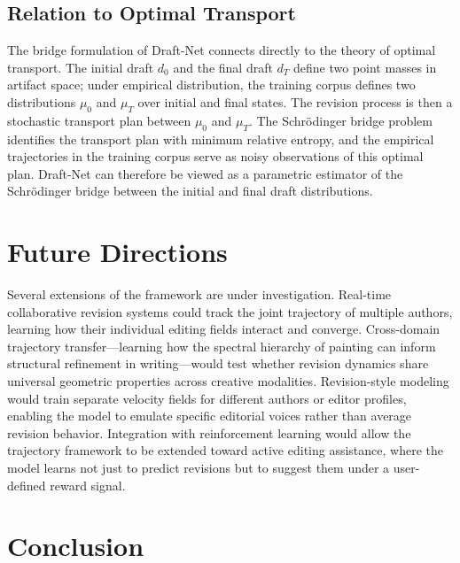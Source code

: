 \documentclass[12pt,a4paper]{article}
\theoremstyle{draftthm}
\begin{document}
\subsection{Relation to Optimal Transport}

The bridge formulation of Draft-Net connects directly to the theory of optimal transport. The initial draft $d_0$ and the final draft $d_T$ define two point masses in artifact space; under empirical distribution, the training corpus defines two distributions $\mu_0$ and $\mu_T$ over initial and final states. The revision process is then a stochastic transport plan between $\mu_0$ and $\mu_T$. The Schrödinger bridge problem identifies the transport plan with minimum relative entropy, and the empirical trajectories in the training corpus serve as noisy observations of this optimal plan. Draft-Net can therefore be viewed as a parametric estimator of the Schrödinger bridge between the initial and final draft distributions.

\section{Future Directions}

Several extensions of the framework are under investigation. Real-time collaborative revision systems could track the joint trajectory of multiple authors, learning how their individual editing fields interact and converge. Cross-domain trajectory transfer---learning how the spectral hierarchy of painting can inform structural refinement in writing---would test whether revision dynamics share universal geometric properties across creative modalities. Revision-style modeling would train separate velocity fields for different authors or editor profiles, enabling the model to emulate specific editorial voices rather than average revision behavior. Integration with reinforcement learning would allow the trajectory framework to be extended toward active editing assistance, where the model learns not just to predict revisions but to suggest them under a user-defined reward signal.

\section{Conclusion}
\end{document}
